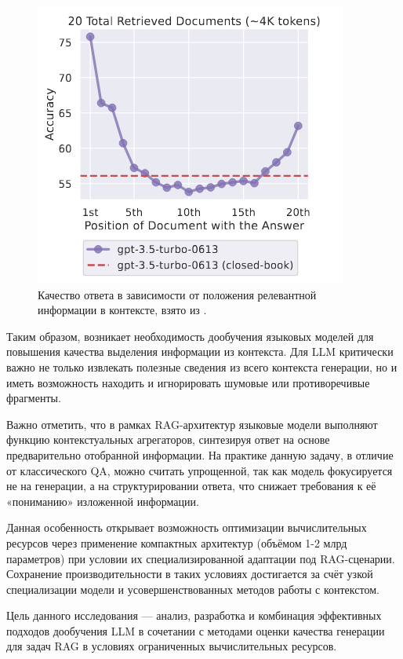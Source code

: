 \begin{enumerate}
    \begin{figure}[h!]
        \centering
        \includegraphics[scale=0.9]{images/Lost_in_the_middle.png}
        \caption{Качество ответа в зависимости от положения релевантной информации в контексте, взято из \cite{lost_in_the_middle}.}
        \label{Lost in the middle}
    \end{figure}
  
\end{enumerate}

Таким образом, возникает необходимость дообучения языковых моделей для повышения качества выделения информации из контекста. Для LLM критически важно не только извлекать полезные сведения из всего контекста генерации, но и иметь возможность находить и игнорировать шумовые или противоречивые фрагменты.

Важно отметить, что в рамках RAG-архитектур языковые модели выполняют функцию контекстуальных агрегаторов, синтезируя ответ на основе предварительно отобранной информации. На практике данную задачу, в отличие от классического QA, можно считать упрощенной, так как модель фокусируется не на генерации, а на структурировании ответа, что снижает требования к её «пониманию» изложенной информации.

Данная особенность открывает возможность оптимизации вычислительных ресурсов через применение компактных архитектур (объёмом 1-2 млрд параметров) при условии их специализированной адаптации под RAG-сценарии. Сохранение производительности в таких условиях достигается за счёт узкой специализации модели и усовершенствованных методов работы с контекстом.

Цель данного исследования — анализ, разработка и комбинация эффективных подходов дообучения LLM в сочетании с методами оценки качества генерации для задач RAG в условиях ограниченных вычислительных ресурсов.

\newpage
